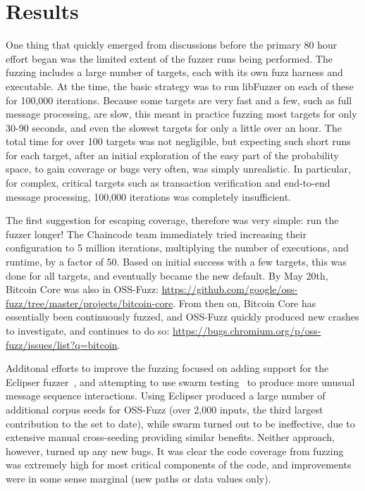 \section{Results}

One thing that quickly emerged from discussions before the primary 80 hour effort began was the limited extent of the fuzzer runs being performed.  The fuzzing includes a large number of targets, each with its own fuzz harness and executable.  At the time, the basic strategy was to run libFuzzer on each of these for 100,000 iterations.  Because some targets are very fast and a few, such as full message processing, are slow, this meant in practice fuzzing most targets for only 30-90 seconds, and even the slowest targets for only a little over an hour.  The total time for over 100 targets was not negligible, but expecting such short runs for each target, after an initial exploration of the easy part of the probability space, to gain coverage or bugs very often, was simply unrealistic.  In particular, for complex, critical targets such as transaction verification and end-to-end message processing, 100,000 iterations was completely insufficient.  

The first suggestion for escaping coverage, therefore was very simple:  run the fuzzer longer!  The Chaincode team immediately tried increasing their configuration to 5 million iterations, multiplying the number of executions, and runtime, by a factor of 50.  Based on initial success with a few targets, this was done for all targets, and eventually became the new default.  By May 20th, Bitcoin Core was also in OSS-Fuzz: \url{https://github.com/google/oss-fuzz/tree/master/projects/bitcoin-core}.  From then on, Bitcoin Core has essentially been continuously fuzzed, and OSS-Fuzz quickly produced new crashes to investigate, and continues to do so:  \url{https://bugs.chromium.org/p/oss-fuzz/issues/list?q=bitcoin}.

Additonal efforts to improve the fuzzing focused on adding support for the Eclipser fuzzer~\cite{Eclipser}, and attempting to use swarm testing~\cite{ISSTA12} to produce more unusual message sequence interactions.  Using Eclipser produced a large number of additional corpus seeds for OSS-Fuzz (over 2,000 inputs, the third largest contribution to the set to date), while swarm turned out to be ineffective, due to extensive manual cross-seeding providing similar benefits.  Neither approach, however, turned up any new bugs.  It was clear the code coverage from fuzzing was extremely high for most critical components of the code, and improvements were in some sense marginal (new paths or data values only).

